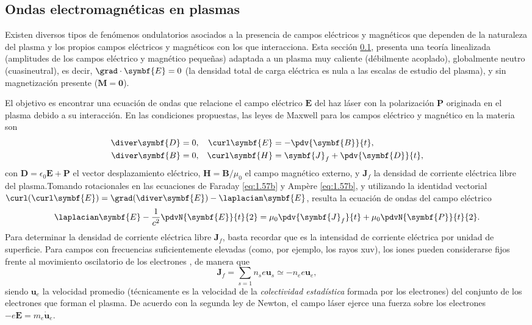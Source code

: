 \subsection{Ondas electromagnéticas en plasmas}\label{sec:1.2.2}
Existen diversos tipos de fenómenos ondulatorios asociados a la presencia de campos eléctricos y magnéticos que dependen de la naturaleza del plasma y los propios campos eléctricos y magnéticos con los que interacciona. Esta sección \ref{sec:1.2.2}, presenta una teoría linealizada \autocite{Chen2015,Bittencourt2004} (amplitudes de los campos eléctrico y magnético pequeñas) adaptada a un plasma muy caliente (débilmente acoplado), globalmente neutro (cuasineutral), es decir, $\grad \cdot \symbf{E} = 0$ (la densidad total de carga eléctrica es nula a las escalas de estudio del plasma)\autocite{Sureau1995}, y sin magnetización presente ($\symbf{M}=\symbf{0}$).

El objetivo es encontrar una ecuación de ondas que relacione el campo eléctrico $\symbf{E}$ del haz láser con la polarización $\symbf{P}$ originada en el plasma debido a su interacción. En las condiciones propuestas, las leyes de Maxwell para los campos eléctrico y magnético en la materia son \autocite{Griffiths2017}
\begin{align}
  \diver \symbf{D} &= 0, &\label{eq:1.57b} \curl \symbf{E} &= -\pdv{\symbf{B}}{t}, \\
  \diver \symbf{B} &= 0, &\label{eq:1.57d} \curl \symbf{H} &= \symbf{J}_{f} + \pdv{\symbf{D}}{t}, 
\end{align}
con $\symbf{D}=\epsilon_{0}\symbf{E} + \symbf{P}$ el vector desplazamiento eléctrico,  $\symbf{H}=\symbf{B}/\mu_{0}$ el campo magnético externo, y $\symbf{J}_{f}$ la densidad de corriente eléctrica libre del plasma.Tomando rotacionales en las ecuaciones de Faraday \eqref{eq:1.57b} y Ampère \eqref{eq:1.57b}, y utilizando la identidad vectorial $\curl (\curl \symbf{E}) = \grad (\diver \symbf{E}) - \laplacian \symbf{E}$, resulta la ecuación de ondas del campo eléctrico
\begin{equation}\label{eq:1.58}
  \laplacian \symbf{E} - \frac{1}{c^{2}}\pdvN{\symbf{E}}{t}{2} = \mu_{0}\pdv{\symbf{J}_{f}}{t} + \mu_{0}\pdvN{\symbf{P}}{t}{2}.
\end{equation}
Para determinar la densidad de corriente eléctrica libre $\symbf{J}_{f}$, basta recordar que es la intensidad de corriente eléctrica por unidad de superficie. Para campos con frecuencias suficientemente elevadas (como, por ejemplo, los rayos \acrshort{xuv}), los iones pueden considerarse fijos frente al movimiento oscilatorio de los electrones \autocite{Bittencourt2004}, de manera que
\begin{equation}\label{eq:1.59}
  \symbf{J}_{f} = \sum_{s=1} n_{s}e \symbf{u}_{s} \simeq -n_{e}e \symbf{u}_{e},
\end{equation}
siendo $\symbf{u}_{e}$ la velocidad promedio (técnicamente es la velocidad de la \emph{colectividad estadística} formada por los electrones) del conjunto de los electrones que forman el plasma. De acuerdo con la segunda ley de Newton, el campo láser ejerce una fuerza sobre los electrones $-e\symbf{E}=m_{e}\dot{\symbf{u}}_{e}$. 

